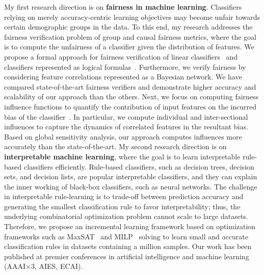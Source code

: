 \documentclass[11pt]{article}
\begin{document}
	My first research direction is on \textbf{fairness in machine learning}. Classifiers relying on merely accuracy-centric learning objectives may become unfair towards certain demographic groups in the data. To this end, my research addresses the fairness verification problem of group and causal fairness metrics, where the goal is to compute the unfairness of a classifier given the distribution of features. We propose a formal approach for fairness verification of linear classifiers~\cite{ghosh2021algorithmic} and classifiers represented as logical formulas~\cite{ghosh2020justicia}. Furthermore, we verify fairness by considering feature correlations represented as a Bayesian network. We have compared state-of-the-art fairness verifiers and demonstrate higher accuracy and scalability of our approach than the others. Next, we focus on computing fairness influence functions to quantify the contribution of input features on the incurred bias of the classifier~\cite{ghosh2021how}. In particular, we compute individual and inter-sectional influences to capture the dynamics of correlated features in the resultant bias. Based on global sensitivity analysis, our approach computes influences more accurately than the state-of-the-art. My second research direction is on \textbf{interpretable machine learning}, where the goal is to learn interpretable rule-based classifiers efficiently. Rule-based classifiers, such as decision trees, decision sets, and decision lists, are popular interpretable classifiers, and they can explain the inner working of black-box classifiers, such as neural networks. The challenge in interpretable rule-learning is to trade-off between prediction accuracy and generating the smallest classification rule to favor interpretability; thus, the underlying combinatorial optimization problem cannot scale to large datasets. Therefore, we propose an incremental learning framework based on optimization frameworks such as  MaxSAT~\cite{ghosh19incremental,ghosh19efficient,ciampiconi20maxsat} and MILP~\cite{ghosh20classification} solving to learn small and accurate classification rules in datasets containing a million samples. Our work has been published at premier conferences in artificial intelligence and machine learning (AAAI$ \times 3$, AIES, ECAI).
	 
	
	
	
	
\end{document}
